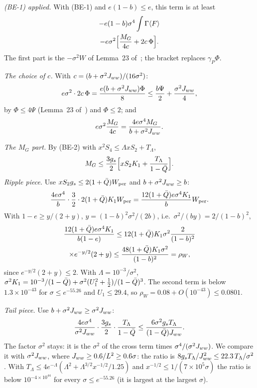 \emph{(BE-1) applied.} With (BE-1) and $e(1-b)\le e$, this term is at least
\begin{multline}
-e(1-b)\sigma^4\int\Gamma\langle F\rangle\\
-e\sigma^2\Bigl[\frac{M_G}{4c}+2c\,\Phi\Bigr].
\end{multline}
The first part is the $-\sigma^2W$ of Lemma~23 of~\cite{F}; the bracket replaces $\gamma_P\Phi$.

\emph{The choice of $c$.} With $c=(b+\sigma^2J_{ww})/(16\sigma^2)$:
\begin{equation}
e\sigma^2\cdot2c\,\Phi=\frac{e(b+\sigma^2J_{ww})\Phi}{8}\le\frac{b\Psi}2+\frac{\sigma^2J_{ww}}4,
\end{equation}
by $\Phi\le4\Psi$ (Lemma~23 of~\cite{F}) and $\Phi\le2$; and
\begin{equation}
e\sigma^2\frac{M_G}{4c}=\frac{4e\sigma^4M_G}{b+\sigma^2J_{ww}}.
\end{equation}

\emph{The $M_G$ part.} By (BE-2) with $x^2S_4\le\Lambda xS_2+T_\Lambda$,
\begin{equation}
M_G\le\frac{3g_s}2\Bigl[xS_2K_1+\frac{T_\Lambda}{1-\bar Q}\Bigr].
\end{equation}
\emph{Ripple piece.} Use $xS_2g_s\le2(1+\bar Q)W_{\rm per}$ and $b+\sigma^2J_{ww}\ge b$:
\begin{equation}
\frac{4e\sigma^4}{b}\cdot\frac32\cdot2(1+\bar Q)K_1W_{\rm per}=\frac{12(1+\bar Q)e\sigma^4K_1}{b}W_{\rm per}.
\end{equation}
With $1-e\ge y/(2+y)$, $y=(1-b)^2\sigma^2/(2b)$, i.e.\ $\sigma^2/(by)=2/(1-b)^2$,
\begin{multline}
\frac{12(1+\bar Q)e\sigma^4K_1}{b(1-e)}\le12(1+\bar Q)K_1\sigma^2\frac{2}{(1-b)^2}\\
\times e^{-y/2}(2+y)\le\frac{48(1+\bar Q)K_1\sigma^2}{(1-b)^2}=\rho_W,
\end{multline}
since $e^{-y/2}(2+y)\le2$.
With $\Lambda=10^{-3}/\sigma^2$, $\sigma^2K_1=10^{-3}/(1-\bar Q)+\sigma^2(U_1^2+\frac12)/(1-\bar Q)^3$.
The second term is below $1.3\times10^{-43}$ for $\sigma\le e^{-55.26}$ and $U_1\le29.4$, so $\rho_W=0.08+O(10^{-43})\le0.0801$.

\emph{Tail piece.} Use $b+\sigma^2J_{ww}\ge\sigma^2J_{ww}$:
\begin{equation}
\frac{4e\sigma^4}{\sigma^2J_{ww}}\cdot\frac{3g_s}{2}\cdot\frac{T_\Lambda}{1-\bar Q}\le\frac{6\sigma^2g_sT_\Lambda}{(1-\bar Q)J_{ww}}.
\end{equation}
The factor $\sigma^2$ stays: it is the $\sigma^2$ of the cross term times $\sigma^4/(\sigma^2J_{ww})$.
We compare it with $\sigma^2J_{ww}$, where $J_{ww}\ge0.6/L^2\ge0.6\sigma$: the ratio is $8g_sT_\Lambda/J_{ww}^2\le22.3\,T_\Lambda/\sigma^2$.
With $T_\Lambda\le4e^{-\Lambda}(\Lambda^2+\Lambda^{3/2}x^{-1/2}/1.25)$ and $x^{-1/2}\le1/(7\times10^5\sigma)$ the ratio is below $10^{-4\times10^{44}}$ for every $\sigma\le e^{-55.26}$ (it is largest at the largest $\sigma$).

